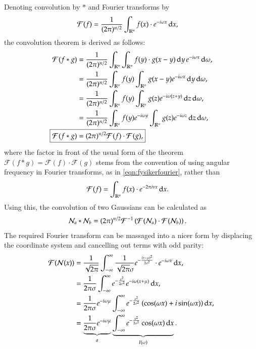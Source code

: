 Denoting convolution by $*$ and Fourier transforms by
\begin{align}
	\mathcal{F}(f) &= \frac{1}{(2\pi)^{n/2}} \int_{\mathbb{R}^n} f(x)\cdot e^{-i\omega x} \operatorname{d\!} x, \label{eqn:fysikerfourier}
\end{align}
the convolution theorem is derived as follows:
\begin{align}
	\mathcal{F}(f*g) &= \fnorm \rint  \rint f(y)\cdot g(x-y) \ud y \, e^{-i\omega x}      \ud \omega, \\
	&= \fnorm \rint f(y) \rint g(x-y) e^{-i\omega x} \ud y \ud\omega, \\
	&= \fnorm \rint f(y) \rint g(z) e^{-i\omega (z+y)} \ud z \ud\omega, \\
	&= \fnorm \rint f(y) e^{-i\omega y} \rint g(z) e^{-i\omega z} \ud z \ud\omega, \\
	\Aboxed{\mathcal{F}(f*g) &= (2\pi)^{n/2} \mathcal{F}(f)\cdot \mathcal{F}(g),} \label{eqn:convolution_theorem}
\end{align}
where the factor in front of the usual form of the theorem $\mathcal{F}(f*g) = \mathcal{F}(f)\cdot \mathcal{F}(g)$ stems from the convention of using angular frequency in Fourier transforms, as in \eqref{eqn:fysikerfourier}, rather than
\begin{align}
	\mathcal{F}(f) &= \int_{\mathbb{R}^n} f(x)\cdot e^{-2\pi i \nu x} \operatorname{d\!} x.
\end{align}
Using this, the convolution of two Gaussians can be calculated as
\begin{align}
	\mathcal{N}_a*\mathcal{N}_b &= (2\pi)^{n/2} \mathcal{F}^{-1} \left( \mathcal{F}(\mathcal{N}_a)\cdot \mathcal{F}(\mathcal{N}_b) \right).
\end{align}
The required Fourier transform can be massaged into a nicer form by displacing the coordinate system and cancelling out terms with odd parity:
\begin{align}
	\mathcal{F}(\mathcal{N}(x)) &= \frac{1}{\sqrt{2\pi}} \int_{-\infty}^\infty \frac{1}{\sqrt{2\pi}\sigma} e^{-\frac{(x-\mu)^2}{2\sigma^2}}\cdot e^{-i\omega x} \operatorname{d\!} x, \nonumber \\
	&= \frac{1}{2\pi\sigma} \int_{-\infty}^\infty e^{-\frac{x^2}{2\sigma^2}} e^{-i\omega(x+\mu)} \operatorname{d\!} x, \nonumber \\
	&= \frac{1}{2\pi\sigma}e^{-i\omega\mu} \int_{-\infty}^\infty e^{-\frac{x^2}{2\sigma^2}} \left( \cos(\omega x) + i\sin(\omega x) \right) \operatorname{d\!} x, \nonumber \\
	&= \underbrace{ \frac{1}{2\pi\sigma}e^{-i\omega\mu} }_a \underbrace{\int_{-\infty}^\infty e^{-\frac{x^2}{2\sigma^2}} \cos(\omega x)\operatorname{d\!} x}_{I(\omega)}. \label{eqn:feynmanstuffgoeshere}
\end{align}

